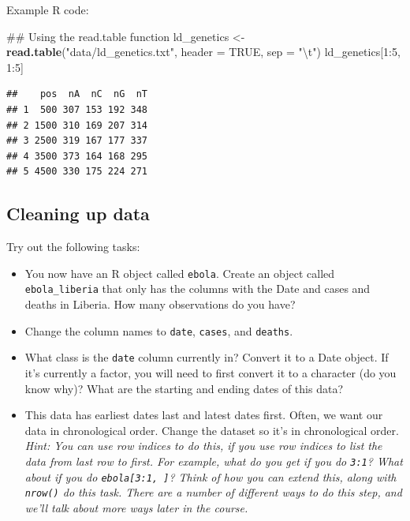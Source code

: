 \documentclass[]{book}
\makeatletter
\newenvironment{Shaded}{\begin{snugshade}}{\end{snugshade}}
\newcommand{\KeywordTok}[1]{\textcolor[rgb]{0.13,0.29,0.53}{\textbf{{#1}}}}
\newcommand{\DataTypeTok}[1]{\textcolor[rgb]{0.13,0.29,0.53}{{#1}}}
\newcommand{\DecValTok}[1]{\textcolor[rgb]{0.00,0.00,0.81}{{#1}}}
\newcommand{\CharTok}[1]{\textcolor[rgb]{0.31,0.60,0.02}{{#1}}}
\newcommand{\StringTok}[1]{\textcolor[rgb]{0.31,0.60,0.02}{{#1}}}
\newcommand{\OtherTok}[1]{\textcolor[rgb]{0.56,0.35,0.01}{{#1}}}
\newcommand{\NormalTok}[1]{{#1}}
\providecommand{\tightlist}{%
  \setlength{\itemsep}{0pt}\setlength{\parskip}{0pt}}
\newenvironment{kframe}{%
\medskip{}
\setlength{\fboxsep}{.8em}
 \def\at@end@of@kframe{}%
 \ifinner\ifhmode%
  \def\at@end@of@kframe{\end{minipage}}%
  \begin{minipage}{\columnwidth}%
 \fi\fi%
 \def\FrameCommand##1{\hskip\@totalleftmargin \hskip-\fboxsep
 \colorbox{shadecolor}{##1}\hskip-\fboxsep
     \hskip-\linewidth \hskip-\@totalleftmargin \hskip\columnwidth}%
 \MakeFramed {\advance\hsize-\width
   \@totalleftmargin\z@ \linewidth\hsize
   \@setminipage}}%
 {\par\unskip\endMakeFramed%
 \at@end@of@kframe}
\renewenvironment{Shaded}{\begin{kframe}}{\end{kframe}}
\makeatother
\begin{document}
Example R code:

\begin{Shaded}
\begin{Highlighting}[]
\NormalTok{## Using the read.table function }
\NormalTok{ld_genetics <-}\StringTok{ }\KeywordTok{read.table}\NormalTok{(}\StringTok{"data/ld_genetics.txt"}\NormalTok{, }\DataTypeTok{header =} \OtherTok{TRUE}\NormalTok{,}
                          \DataTypeTok{sep =} \StringTok{"}\CharTok{\textbackslash{}t}\StringTok{"}\NormalTok{)}
\NormalTok{ld_genetics[}\DecValTok{1}\NormalTok{:}\DecValTok{5}\NormalTok{, }\DecValTok{1}\NormalTok{:}\DecValTok{5}\NormalTok{]}
\end{Highlighting}
\end{Shaded}

\begin{verbatim}
##    pos  nA  nC  nG  nT
## 1  500 307 153 192 348
## 2 1500 310 169 207 314
## 3 2500 319 167 177 337
## 4 3500 373 164 168 295
## 5 4500 330 175 224 271
\end{verbatim}

\subsection{Cleaning up data}\label{cleaning-up-data}

Try out the following tasks:

\begin{itemize}
\tightlist
\item
  You now have an R object called \texttt{ebola}. Create an object
  called \texttt{ebola\_liberia} that only has the columns with the Date
  and cases and deaths in Liberia. How many observations do you have?
\item
  Change the column names to \texttt{date}, \texttt{cases}, and
  \texttt{deaths}.
\item
  What class is the \texttt{date} column currently in? Convert it to a
  Date object. If it's currently a factor, you will need to first
  convert it to a character (do you know why)? What are the starting and
  ending dates of this data?
\item
  This data has earliest dates last and latest dates first. Often, we
  want our data in chronological order. Change the dataset so it's in
  chronological order. \emph{Hint: You can use row indices to do this,
  if you use row indices to list the data from last row to first. For
  example, what do you get if you do \texttt{3:1}? What about if you do
  \texttt{ebola{[}3:1,\ {]}}? Think of how you can extend this, along
  with \texttt{nrow()} do this task. There are a number of different
  ways to do this step, and we'll talk about more ways later in the
  course.}
\end{itemize}
\end{document}
